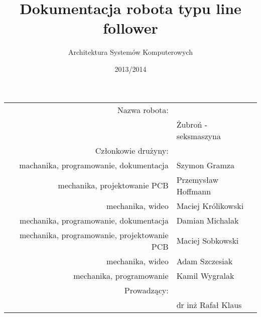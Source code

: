 \documentclass[11pt,a4paper]{article}
\author{Architektura Systemów Komputerowych}
\title{Dokumentacja robota typu line follower}
\date{2013/2014}
\begin{document}
\vspace{3cm}
\maketitle
\vspace{2cm}

\begin{center}
\begin{tabularx}{\linewidth}{rl}
  \hline
  Nazwa robota: & \\
  & Żubroń - seksmaszyna \\
  \hline 
  Członkowie drużyny: & \\
  machanika, programowanie, dokumentacja & Szymon Gramza \\
  mechanika, projektowanie PCB & Przemysław Hoffmann \\
  mechanika, wideo & Maciej Królikowski \\
  mechanika, programowanie, dokumentacja & Damian Michalak \\
  mechanika, programowanie, projektowanie PCB & Maciej Sobkowski \\
  mechanika, wideo & Adam Szczesiak \\
  mechanika, programowanie & Kamil Wygralak \\
  \hline
  Prowadzący: & \\
  & dr inż Rafał Klaus \\
  \hline
\end{tabularx} 
\end{center} %

\newpage
\tableofcontents
\newpage
\end{document}
